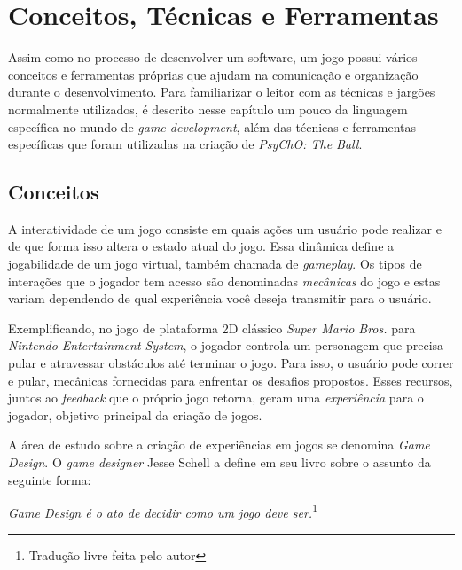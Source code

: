 
\chapter{Conceitos, Técnicas e Ferramentas}
\label{cap:conceitos_tecnicas_e_ferramentas}

Assim como no processo de desenvolver um software, um jogo possui vários conceitos e ferramentas próprias que ajudam na comunicação e organização durante o desenvolvimento.
Para familiarizar o leitor com as técnicas e jargões normalmente utilizados, é descrito nesse capítulo um pouco da linguagem específica no mundo de \textit{game development}, além das técnicas e ferramentas específicas que foram utilizadas na criação de \textit{PsyChO: The Ball}.

\section{Conceitos}
\label{sec:conceitos}
A interatividade de um jogo consiste em quais ações um usuário pode realizar e de que forma isso altera o estado atual do jogo. Essa dinâmica define a jogabilidade de um jogo virtual, também chamada de \textit{gameplay}. Os tipos de interações que o jogador tem acesso são denominadas \textit{mecânicas} do jogo e estas variam dependendo de qual experiência você deseja transmitir para o usuário.

Exemplificando, no jogo de plataforma 2D clássico \textit{Super Mario Bros.} para \textit{Nintendo Entertainment System}\cite{mario}, o jogador controla um personagem que precisa pular e atravessar obstáculos até terminar o jogo. Para isso, o usuário pode correr e pular, mecânicas fornecidas para enfrentar os desafios propostos. Esses recursos, juntos ao \textit{feedback} que o próprio jogo retorna, geram uma \textit{experiência} para o jogador, objetivo principal da criação de jogos.

A área de estudo sobre a criação de experiências em jogos se denomina \textit{Game Design}. O \textit{game designer} Jesse Schell a define em seu livro sobre o assunto \cite{jessegamedesign} da seguinte forma:

\begin{displayquote}
  \textit{Game Design é o ato de decidir como um jogo deve ser.}\footnote{Tradução livre feita pelo autor}
\end{displayquote}

